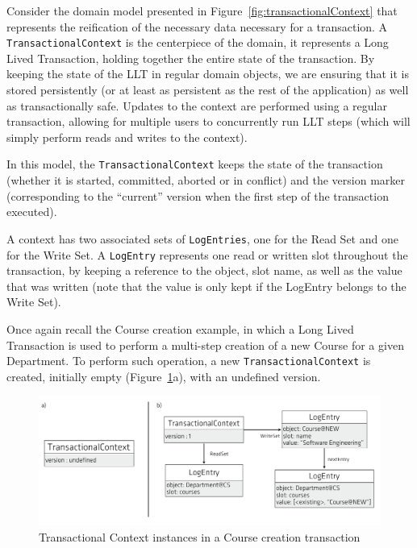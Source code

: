 Consider the domain model presented in
Figure~\ref{fig:transactionalContext} that represents the reification
of the necessary data necessary for a transaction. A
\texttt{TransactionalContext} is the centerpiece of the domain, it
represents a Long Lived Transaction, holding together the entire state
of the transaction. By keeping the state of the LLT in regular domain
objects, we are ensuring that it is stored persistently (or at least
as persistent as the rest of the application) as well as
transactionally safe. Updates to the context are performed using a
regular transaction, allowing for multiple users to concurrently run
LLT steps (which will simply perform reads and writes to the context).

In this model, the \texttt{TransactionalContext} keeps the state of
the transaction (whether it is started, committed, aborted or in
conflict) and the version marker (corresponding to the ``current''
version when the first step of the transaction executed).

A context has two associated sets of \texttt{LogEntries}, one for the
Read Set and one for the Write Set. A \texttt{LogEntry} represents one
read or written slot throughout the transaction, by keeping a
reference to the object, slot name, as well as the value that was
written (note that the value is only kept if the LogEntry belongs to
the Write Set).

Once again recall the Course creation example, in which a Long Lived
Transaction is used to perform a multi-step creation of a new Course
for a given Department. To perform such operation, a new
\texttt{TransactionalContext} is created, initially empty
(Figure~\ref{fig:course-logEntries}a), with an undefined version.

\begin{figure}
\centering
\includegraphics[width=1\linewidth]{log-entries}
\caption{Transactional Context instances in a Course creation transaction}
\label{fig:course-logEntries}
\end{figure}

